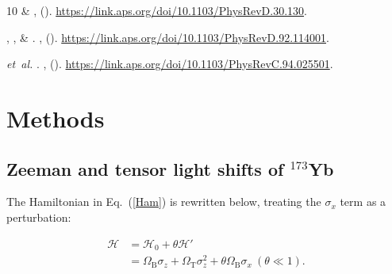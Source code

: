 \documentclass[pdflatex,sn-nature,centre]{sn-jnl}%
\begin{document}
\begin{thebibliography}{10}
 \& 
\newblock {}
\newblock \emph{} \textbf{},  ().
\newblock \urlprefix\url{https://link.aps.org/doi/10.1103/PhysRevD.30.130}.

, ,  \& 
\newblock {}.
\newblock \emph{} \textbf{},  ().
\newblock \urlprefix\url{https://link.aps.org/doi/10.1103/PhysRevD.92.114001}.

 \emph{et~al.}
\newblock {}.
\newblock \emph{} \textbf{},  ().
\newblock \urlprefix\url{https://link.aps.org/doi/10.1103/PhysRevC.94.025501}.
\end{thebibliography}

%


\section*{Methods}
\subsection* {Zeeman and tensor light shifts of $^{173}$Yb}\label{CombinedShift}

The Hamiltonian in Eq.~(\ref{Ham}) is rewritten below, treating the $\sigma_x$ term as a perturbation:

\begin{equation}\label{Ham_pur}
\begin{aligned}
    \mathscr H & = \mathscr{H}_0+\theta\mathscr{H}' \\
    & = \Omega_{\mathrm B}\sigma_z + \Omega_{\mathrm T}\sigma_z^2 + \theta\Omega_{\mathrm B}\sigma_x\ (\theta\ll 1).
\end{aligned}
\end{equation}
\end{document}
